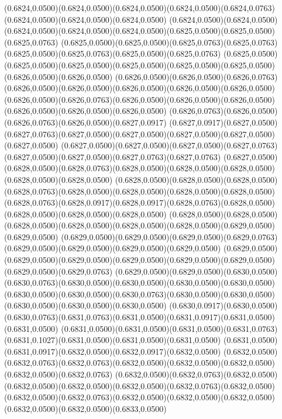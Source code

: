 (0.6824,0.0500)(0.6824,0.0500)(0.6824,0.0500)(0.6824,0.0500)(0.6824,0.0763)(0.6824,0.0500)(0.6824,0.0500)(0.6824,0.0500)
(0.6824,0.0500)(0.6824,0.0500)(0.6824,0.0500)(0.6824,0.0500)(0.6824,0.0500)(0.6825,0.0500)(0.6825,0.0500)(0.6825,0.0763)
(0.6825,0.0500)(0.6825,0.0500)(0.6825,0.0763)(0.6825,0.0763)(0.6825,0.0500)(0.6825,0.0763)(0.6825,0.0500)(0.6825,0.0763)
(0.6825,0.0500)(0.6825,0.0500)(0.6825,0.0500)(0.6825,0.0500)(0.6825,0.0500)(0.6825,0.0500)(0.6826,0.0500)(0.6826,0.0500)
(0.6826,0.0500)(0.6826,0.0500)(0.6826,0.0763)(0.6826,0.0500)(0.6826,0.0500)(0.6826,0.0500)(0.6826,0.0500)(0.6826,0.0500)
(0.6826,0.0500)(0.6826,0.0763)(0.6826,0.0500)(0.6826,0.0500)(0.6826,0.0500)(0.6826,0.0500)(0.6826,0.0500)(0.6826,0.0500)
(0.6826,0.0763)(0.6826,0.0500)(0.6826,0.0763)(0.6826,0.0500)(0.6827,0.0917)
\PST@Solid(0.6827,0.0917)(0.6827,0.0500)(0.6827,0.0763)(0.6827,0.0500)(0.6827,0.0500)(0.6827,0.0500)(0.6827,0.0500)(0.6827,0.0500)
(0.6827,0.0500)(0.6827,0.0500)(0.6827,0.0500)(0.6827,0.0763)(0.6827,0.0500)(0.6827,0.0500)(0.6827,0.0763)(0.6827,0.0763)
(0.6827,0.0500)(0.6828,0.0500)(0.6828,0.0763)(0.6828,0.0500)(0.6828,0.0500)(0.6828,0.0500)(0.6828,0.0500)(0.6828,0.0500)
(0.6828,0.0500)(0.6828,0.0500)(0.6828,0.0500)(0.6828,0.0763)(0.6828,0.0500)(0.6828,0.0500)(0.6828,0.0500)(0.6828,0.0500)
(0.6828,0.0763)(0.6828,0.0917)(0.6828,0.0917)(0.6828,0.0763)(0.6828,0.0500)(0.6828,0.0500)(0.6828,0.0500)(0.6828,0.0500)
(0.6828,0.0500)(0.6828,0.0500)(0.6828,0.0500)(0.6828,0.0500)(0.6828,0.0500)(0.6828,0.0500)(0.6829,0.0500)(0.6829,0.0500)
(0.6829,0.0500)(0.6829,0.0500)(0.6829,0.0500)(0.6829,0.0763)(0.6829,0.0500)(0.6829,0.0500)(0.6829,0.0500)(0.6829,0.0500)
(0.6829,0.0500)(0.6829,0.0500)(0.6829,0.0500)(0.6829,0.0500)(0.6829,0.0500)(0.6829,0.0500)(0.6829,0.0500)(0.6829,0.0763)
(0.6829,0.0500)(0.6829,0.0500)(0.6830,0.0500)(0.6830,0.0763)(0.6830,0.0500)(0.6830,0.0500)(0.6830,0.0500)(0.6830,0.0500)
(0.6830,0.0500)(0.6830,0.0500)(0.6830,0.0763)(0.6830,0.0500)(0.6830,0.0500)(0.6830,0.0500)(0.6830,0.0500)(0.6830,0.0500)
(0.6830,0.0917)(0.6830,0.0500)(0.6830,0.0763)(0.6831,0.0763)(0.6831,0.0500)(0.6831,0.0917)(0.6831,0.0500)(0.6831,0.0500)
(0.6831,0.0500)(0.6831,0.0500)(0.6831,0.0500)(0.6831,0.0763)(0.6831,0.1027)(0.6831,0.0500)(0.6831,0.0500)(0.6831,0.0500)
(0.6831,0.0500)(0.6831,0.0917)(0.6832,0.0500)(0.6832,0.0917)(0.6832,0.0500)
\PST@Solid(0.6832,0.0500)(0.6832,0.0763)(0.6832,0.0763)(0.6832,0.0500)(0.6832,0.0500)(0.6832,0.0500)(0.6832,0.0500)(0.6832,0.0763)
(0.6832,0.0500)(0.6832,0.0763)(0.6832,0.0500)(0.6832,0.0500)(0.6832,0.0500)(0.6832,0.0500)(0.6832,0.0763)(0.6832,0.0500)
(0.6832,0.0500)(0.6832,0.0763)(0.6832,0.0500)(0.6832,0.0500)(0.6832,0.0500)(0.6832,0.0500)(0.6832,0.0500)(0.6833,0.0500)
